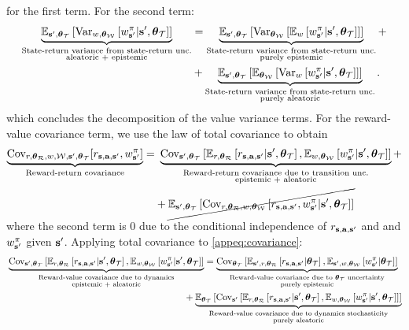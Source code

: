 \documentclass{article}
\begin{document}
for the first term. For the second term:
\begin{align*}
\underbrace{\E_{\ns, \thetamct}\sqb{\Var_{w, \thetamcw} \sqb{\wnb | \ns, \thetamct}}}_{\substack{\text{State-return variance from state-return unc.} \\ \text{aleatoric + epistemic}}} &=  \underbrace{\E_{\ns, \thetamct}\sqb{\Var_{\thetamcw} \sqb{ \E_w \sqb{\wnb | \ns, \thetamct}}}}_{\substack{\text{State-return variance from state-return unc.} \\ \text{purely epistemic}}} +\\
&+  \underbrace{\E_{\ns, \thetamct}\sqb{\E_{\thetamcw} \sqb{ \Var_w \sqb{\wnb | \ns, \thetamct}}}}_{\substack{\text{State-return variance from state-return unc.} \\ \text{purely aleatoric}}}.
\end{align*}
which concludes the decomposition of the value variance terms. For the reward-value covariance term, we use the law of total covariance to obtain
\begin{align}
\underbrace{\Cov_{r, \thetamcr, w, \mcw, \ns, \thetamct}[\rsanb, \wnb]}_{\text{Reward-return covariance}} =&~\underbrace{\Cov_{\ns, \thetamct}\sqb{\E_{r, \thetamcr}\sqb{\rsanb | \ns, \thetamct}, \E_{w, \thetamcw}\sqb{\wnb | \ns, \thetamct}}}_{\substack{\text{Reward-return covariance due to transition unc.} \\ \text{epistemic + aleatoric}}} + \nonumber \\
& + \cancel{\E_{\ns, \thetamct}\sqb{\Cov_{r, \thetamcr, w, \thetamcw}\sqb{\rsanb, \wnb | \ns, \thetamct}}}\label{appeq:covariance}
\end{align}
where the second term is 0 due to the conditional independence of $\rsanb$ and and $\wnb$ given $\ns$. Applying total covariance to \cref{appeq:covariance}:
\begin{align} \label{appeq:covrewval} 
&\underbrace{\Cov_{\ns, \thetamct}\sqb{\E_{r, \thetamcr}\sqb{\rsanb | \ns, \thetamct}, \E_{w, \thetamcw}\sqb{\wnb | \ns, \thetamct}}}_{\substack{\text{Reward-value covariance due to dynamics} \\ \text{epistemic + aleatoric}}}  = \underbrace{\Cov_{\thetamct}\sqb{\E_{\ns, r, \thetamcr}\sqb{\rsanb | \thetamct}, \E_{\ns, w, \thetamcw}\sqb{\wnb | \thetamct}}}_{\substack{\text{Reward-value covariance due to $\thetamct$ uncertainty} \\ \text{purely epistemic}}}  \\ 
&\qquad \qquad \qquad \qquad \qquad \qquad \qquad \qquad \qquad ~~~+\underbrace{\E_{\thetamct}\sqb{\Cov_{\ns}\sqb{\E_{r, \thetamcr}\sqb{\rsanb | \ns, \thetamct}, \E_{w, \thetamcw}\sqb{\wnb | \ns, \thetamct}}}}_{\substack{\text{Reward-value covariance due to dynamics stochasticity} \\ \text{purely aleatoric}}} \nonumber 
\end{align}
\end{document}
